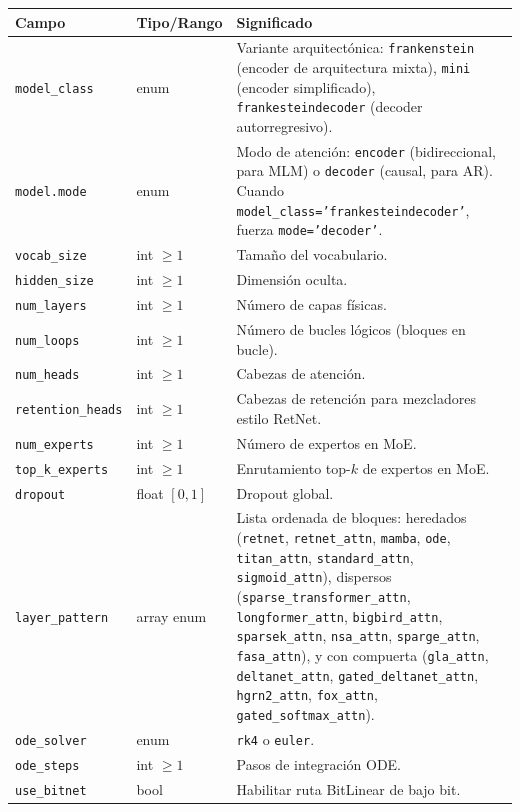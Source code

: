 \documentclass[11pt,a4paper]{article}
\begin{document}
\small
\begin{longtable}{p{5.1cm}p{2.4cm}p{7.0cm}}
\toprule
\textbf{Campo} & \textbf{Tipo/Rango} & \textbf{Significado} \\
\midrule
\endhead
\texttt{model\_class} & enum & Variante arquitectónica: \texttt{frankenstein} (encoder de arquitectura mixta), \texttt{mini} (encoder simplificado), \texttt{frankesteindecoder} (decoder autorregresivo). \\
\texttt{model.mode} & enum & Modo de atención: \texttt{encoder} (bidireccional, para MLM) o \texttt{decoder} (causal, para AR). Cuando \texttt{model\_class='frankesteindecoder'}, fuerza \texttt{mode='decoder'}. \\
\texttt{vocab\_size} & int $\ge 1$ & Tamaño del vocabulario. \\
\texttt{hidden\_size} & int $\ge 1$ & Dimensión oculta. \\
\texttt{num\_layers} & int $\ge 1$ & Número de capas físicas. \\
\texttt{num\_loops} & int $\ge 1$ & Número de bucles lógicos (bloques en bucle). \\
\texttt{num\_heads} & int $\ge 1$ & Cabezas de atención. \\
\texttt{retention\_heads} & int $\ge 1$ & Cabezas de retención para mezcladores estilo RetNet. \\
\texttt{num\_experts} & int $\ge 1$ & Número de expertos en MoE. \\
\texttt{top\_k\_experts} & int $\ge 1$ & Enrutamiento top-$k$ de expertos en MoE. \\
\texttt{dropout} & float $[0,1]$ & Dropout global. \\
\texttt{layer\_pattern} & array enum & Lista ordenada de bloques: heredados (\texttt{retnet}, \texttt{retnet\_attn}, \texttt{mamba}, \texttt{ode}, \texttt{titan\_attn}, \texttt{standard\_attn}, \texttt{sigmoid\_attn}), dispersos (\texttt{sparse\_transformer\_attn}, \texttt{longformer\_attn}, \texttt{bigbird\_attn}, \texttt{sparsek\_attn}, \texttt{nsa\_attn}, \texttt{sparge\_attn}, \texttt{fasa\_attn}), y con compuerta (\texttt{gla\_attn}, \texttt{deltanet\_attn}, \texttt{gated\_deltanet\_attn}, \texttt{hgrn2\_attn}, \texttt{fox\_attn}, \texttt{gated\_softmax\_attn}). \\
\texttt{ode\_solver} & enum & \texttt{rk4} o \texttt{euler}. \\
\texttt{ode\_steps} & int $\ge 1$ & Pasos de integración ODE. \\
\texttt{use\_bitnet} & bool & Habilitar ruta BitLinear de bajo bit. \\

\end{longtable}
\end{document}
